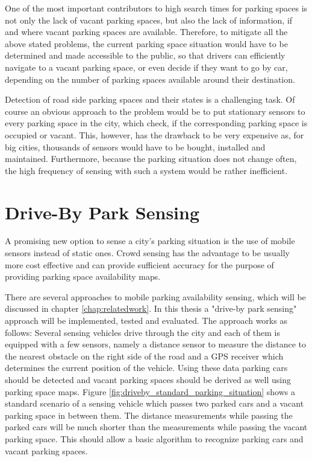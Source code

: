 One of the most important contributors to high search times for parking spaces is not only the lack of vacant parking spaces, but also the lack of information, if and where vacant parking spaces are available. Therefore, to mitigate all the above stated problems, the current parking space situation would have to be determined and made accessible to the public, so that drivers can efficiently navigate to a vacant parking space, or even decide if they want to go by car, depending on the number of parking spaces available around their destination. 

Detection of road side parking spaces and their states is a challenging task. Of course an obvious approach to the problem would be to put stationary sensors to every parking space in the city, which check, if the corresponding parking space is occupied or vacant. This, however, has the drawback to be very expensive as, for big cities, thousands of sensors would have to be bought, installed and maintained. Furthermore, because the parking situation does not change often, the high frequency of sensing with such a system would be rather inefficient.



\section{Drive-By Park Sensing}

A promising new option to sense a city's parking situation is the use of mobile sensors instead of static ones. Crowd sensing has the advantage to be usually more cost effective and can provide sufficient accuracy for the purpose of providing parking space availability maps.

There are several approaches to mobile parking availability sensing, which will be discussed in chapter \ref{chap:relatedwork}. In this thesis a "drive-by park sensing" approach will be implemented, tested and evaluated. The approach works as follows: Several sensing vehicles drive through the city and each of them is equipped with a few sensors, namely a distance sensor to measure the distance to the nearest obstacle on the right side of the road and a GPS receiver which determines the current position of the vehicle. Using these data parking cars should be detected and vacant parking spaces should be derived as well using parking space maps.
Figure \ref{fig:driveby_standard_parking_situation} shows a standard scenario of a sensing vehicle which passes two parked cars and a vacant parking space in between them. The distance measurements while passing the parked cars will be much shorter than the measurements while passing the vacant parking space. This should allow a basic algorithm to recognize parking cars and vacant parking spaces.

